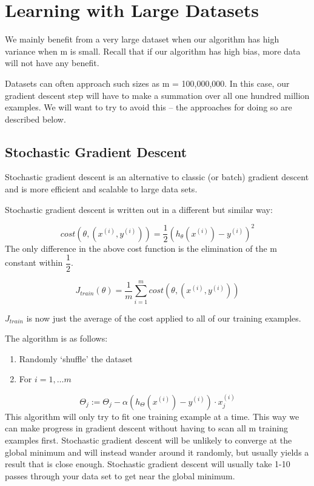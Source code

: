 \chapter{Learning with Large Datasets}
We mainly benefit from a very large dataset when our algorithm has high variance when m is small. Recall that if our algorithm has high bias, more data will not have any benefit.

Datasets can often approach such sizes as m = 100,000,000. In this case, our gradient descent step will have to make a summation over all one hundred million examples. We will want to try to avoid this -- the approaches for doing so are described below.

\section{Stochastic Gradient Descent}
Stochastic gradient descent is an alternative to classic (or batch) gradient descent and is more efficient and scalable to large data sets.

Stochastic gradient descent is written out in a different but similar way:

\begin{equation}
cost(\theta,(x^{(i)}, y^{(i)})) = \dfrac{1}{2}(h_{\theta}(x^{(i)}) - y^{(i)})^2
\end{equation}
The only difference in the above cost function is the elimination of the m constant within $\dfrac{1}{2}$.

\begin{equation}
J_{train}(\theta) = \dfrac{1}{m} \displaystyle \sum_{i=1}^m cost(\theta, (x^{(i)}, y^{(i)}))
\end{equation}

$J_{train}$ is now just the average of the cost applied to all of our training examples.

The algorithm is as follows:
\begin{enumerate}
\item Randomly `shuffle' the dataset
\item For $i=1, \dots m$
\end{enumerate}

$$
\Theta_j := \Theta_j - \alpha (h_{\Theta}(x^{(i)}) - y^{(i)}) \cdot x^{(i)}_j
$$
This algorithm will only try to fit one training example at a time. This way we can make progress in gradient descent without having to scan all m training examples first. Stochastic gradient descent will be unlikely to converge at the global minimum and will instead wander around it randomly, but usually yields a result that is close enough. Stochastic gradient descent will usually take 1-10 passes through your data set to get near the global minimum.


